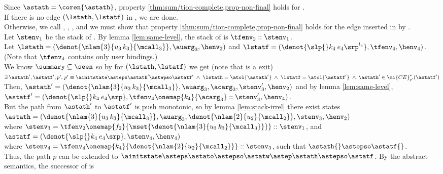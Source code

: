 \documentclass{LMCS}
\theoremstyle{definition} \newtheorem{property}[thm]{Property}
\begin{document}
\begin{enumerate}[$\bullet$]
  Since $\astath = \coren{\astath}$, 
  property \ref{thm:sum/tion-complete,prop-non-final}
  holds for \lstath. \\
  If there is no edge $(\lstath, \lstatf)$ in \summary{}, we are done. \\
  Otherwise, we call \lstato, \lstatw, \lstath, \lstatf\srp{}
  and we must show that property \ref{thm:sum/tion-complete,prop-non-final}
  holds for the edge inserted in \seen{} by .
  \\
  Let $\stenv_1$ be the stack of \astato{}.
  By lemma \ref{lem:same-level}, the stack of \astatw{} is 
  $\tfenv_2 :: \stenv_1$. 
  \\
  Let $\lstath = (\denot{\nlam{3}{u_3 \, k_3}{\mcall_3}}, \auarg_3, \henv_2)$
  and $\lstatf = (\denot{\slp{}k_4 \: e_4\srp^{l_4}}, \tfenv_4, \henv_4)$. \\
  (Note that $\tfenv_4$ contains only user bindings.) \\
  We know $\summary \subseteq \seen$ so by \ih{} for $(\lstath, \lstatf)$ 
  we get (note that \lstatf{} is a \dlceval{} exit) \\
  $\exists \: \astath', \astatf', p'. \;
  p' \equiv \ainitstate \asteps \astath' \astepso \astatf' 
  \;\land\; \lstath = \atol{\astath'} 
  \;\land\; \lstatf = \atol{\astatf'}
  \;\land\; \astath' \in \mi{CE}^*_{p'}(\astatf')$ \\
  Then, $\astath' = (\denot{\nlam{3}{u_3 \, k_3}{\mcall_3}}, \auarg_3, 
  \acarg_3, \stenv_3', \henv_2)$ and by lemma \ref{lem:same-level}, \\
  $\astatf' = (\denot{\slp{}k_4 \: e_4\srp}, 
  \tfenv_4\onemap{k_4}{\acarg_3}::\stenv_3', \henv_4)$. \\
  But the path from $\astath'$ to $\astatf'$ is push monotonic, so by lemma
  \ref{lem:stack-irrel} there exist states \\
  $\astath = (\denot{\nlam{3}{u_3 \, k_3}{\mcall_3}}, \auarg_3, 
  \denot{\nlam{2}{u_2}{\mcall_2}}, \stenv_3, \henv_2)$ \\
  where $\stenv_3 = 
  \tfenv_2\onemap{f_2}{\mset{\denot{\nlam{3}{u_3 \,k_3}{\mcall_3}}}}::\stenv_1$,
  and $\astatf = (\denot{\slp{}k_4 \: e_4\srp}, \stenv_4, \henv_4)$ \\
  where $\stenv_4 = 
  \tfenv_4\onemap{k_4}{\denot{\nlam{2}{u_2}{\mcall_2}}}::\stenv_3$, 
  such that $\astath{} \astepso \astatf{}$. \\
  Thus, the path $p$ can be extended to $\ainitstate \asteps \astato \astepso 
  \astatw \astep \astath \astepso \astatf$.
  By the abstract semantics, the successor \astat{} of \astatf{} is 

\end{enumerate}
\end{document}
